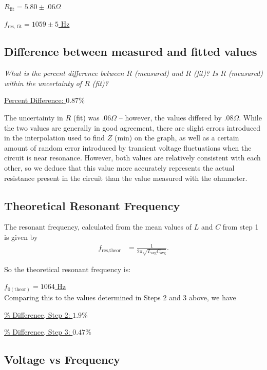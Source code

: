 \documentclass[twocolumn,english]{IEEEtran}
\theoremstyle{plain}
\theoremstyle{plain}
\begin{document}
\hfill\underline{$R_{\text{fit}} = 5.80 \pm .06 \Omega$}

\hfill\underline{$f_{\text{res, fit}} = 1059 \pm 5$ Hz}


\hrulefill

\subsection{Difference between measured and fitted values}

\textit{What is the percent difference between $R$ (measured) and $R$ (fit)? Is $R$ (measured) within the uncertainty of $R$ (fit)?}

\hfill\underline{Percent Difference: $0.87\%$}

The uncertainty in $R$ (fit) was $.06\Omega$ -- however, the values differed by $.08\Omega$. While the two values are generally in good agreement, there are slight errors introduced in the interpolation used to find $Z$ (min) on the graph, as well as a certain amount of random error introduced by transient voltage fluctuations when the circuit is near resonance. However, both values are relatively consistent with each other, so we deduce that this value more accurately represents the actual resistance present in the circuit than the value measured with the ohmmeter.

\hrulefill

\subsection{Theoretical Resonant Frequency}
The resonant frequency, calculated from the mean values of $L$ and $C$ from step 1 is given by
\begin{align}
	f_{\text{res,theor}} &= \frac{1}{2\pi\sqrt{L_{\text{avg}} C_{\text{avg}}}}.
\end{align}

So the theoretical resonant frequency is:

\hfill\underline{$f_{0(\text{theor})} = 1064$ Hz} \\

Comparing this to the values determined in Steps 2 and 3 above, we have

\hfill\underline{\% Difference, Step 2: $1.9\%$}

\hfill\underline{\% Difference, Step 3: $0.47\%$}

\hrulefill

\subsection{Voltage vs Frequency}
\end{document}

